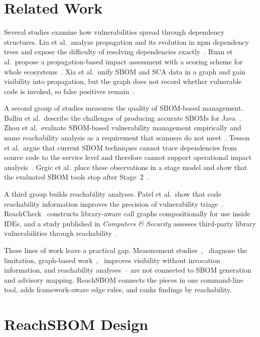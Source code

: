 \documentclass[conference]{IEEEtran}
\begin{document}
\section{Related Work}\label{sec:related}
Several studies examine how vulnerabilities spread through dependency structures. Liu et al.\ analyze propagation and its evolution in npm dependency trees and expose the difficulty of resolving dependencies exactly~\cite{liu}. Ruan et al.\ propose a propagation-based impact assessment with a scoring scheme for whole ecosystems~\cite{ruan}. Xia et al.\ unify SBOM and SCA data in a graph and gain visibility into propagation, but the graph does not record whether vulnerable code is invoked, so false positives remain~\cite{xia}.

A second group of studies measures the quality of SBOM-based management. Balliu et al.\ describe the challenges of producing accurate SBOMs for Java~\cite{balliu}. Zhou et al.\ evaluate SBOM-based vulnerability management empirically and name reachability analysis as a requirement that scanners do not meet~\cite{zhou}. Tesson et al.\ argue that current SBOM techniques cannot trace dependencies from source code to the service level and therefore cannot support operational impact analysis~\cite{tesson}. Grgic et al.\ place these observations in a stage model and show that the evaluated SBOM tools stop after Stage~2~\cite{grgic}.

A third group builds reachability analyses. Patel et al.\ show that code reachability information improves the precision of vulnerability triage~\cite{patel}. ReachCheck~\cite{reachcheck} constructs library-aware call graphs compositionally for use inside IDEs, and a study published in \emph{Computers \& Security} assesses third-party library vulnerabilities through reachability~\cite{cose}.

These lines of work leave a practical gap. Measurement studies~\cite{grgic},~\cite{zhou} diagnose the limitation, graph-based work~\cite{xia},~\cite{ruan} improves visibility without invocation information, and reachability analyses~\cite{reachcheck}--\cite{patel} are not connected to SBOM generation and advisory mapping. ReachSBOM connects the pieces in one command-line tool, adds framework-aware edge rules, and ranks findings by reachability.

\section{ReachSBOM Design}\label{sec:design}
\end{document}
